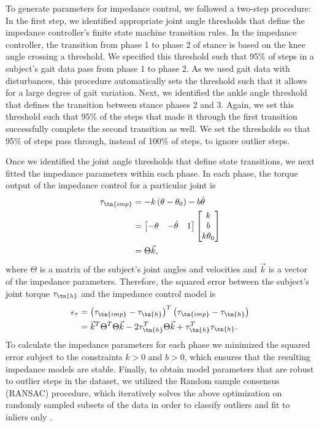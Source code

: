 To generate parameters for impedance control, we followed a two-step procedure:
In the first step, we identified appropriate joint angle thresholds that define
the impedance controller's finite state machine transition rules. In the
impedance controller, the transition from phase 1 to phase 2 of stance is based
on the knee angle crossing a threshold. We specified this threshold such that
95\% of steps in a subject's gait data pass from phase 1 to phase 2. As we used
gait data with disturbances, this procedure automatically sets the threshold
such that it allows for a large degree of gait variation. Next, we identified
the ankle angle threshold that defines the transition between stance phases 2
and 3.  Again, we set this threshold such that 95\% of the steps that made it
through the first transition successfully complete the second transition as
well. We set the thresholds so that 95\% of steps pass through, instead of 100\%
of steps, to ignore outlier steps.

Once we identified the joint angle thresholds that define state transitions, we
next fitted the impedance parameters within each phase. In each phase, the torque
output of the impedance control for a particular joint is 
\begin{align}
    \tau_\tn{imp} &= -k \left( \theta - \theta_0 \right) - b \dot{\theta} \\
        &= \begin{bmatrix} -\theta & -\dot{\theta} & 1 \end{bmatrix}
            \begin{bmatrix} k \\ b \\ k \theta_0 \end{bmatrix} \\
        &= \Theta \vec{k},
\end{align}
where $\Theta$ is a matrix of the subject's joint angles and velocities and
$\vec{k}$ is a vector of the impedance parameters. Therefore, the squared error
between the subject's joint torque $\tau_\tn{h}$ and the impedance control model
is
\begin{align}
    \epsilon_\tau & = {\left( \tau_\tn{imp} - \tau_\tn{h} \right)}^T 
        \left( \tau_\tn{imp} - \tau_\tn{h} \right) \\
        &= \vec{k}^T \Theta^T \Theta \vec{k} - 2\tau_\tn{h}^T \Theta \vec{k} 
        + \tau_\tn{h}^T \tau_\tn{h}.
\end{align}
To calculate the impedance parameters for each phase we minimized the squared
error subject to the constraints $k>0$ and ${b > 0}$, which ensures that the
resulting impedance models are stable. Finally, to obtain model parameters that
are robust to outlier steps in the dataset, we utilized the Random sample
consensus (RANSAC) procedure, which iteratively solves the above optimization on
randomly sampled subsets of the data in order to classify outliers and fit to
inliers only \citep{fischler1981random}.

